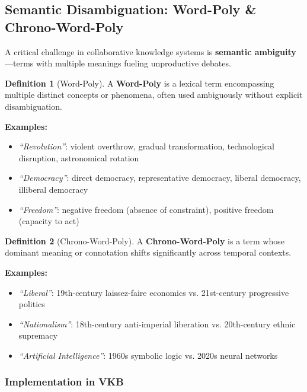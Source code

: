 \documentclass[11pt,a4paper]{article}
\theoremstyle{definition}
\newtheorem{definition}{Definition}[section]
\theoremstyle{remark}
\begin{document}
\subsection{Semantic Disambiguation: Word-Poly \& Chrono-Word-Poly}

A critical challenge in collaborative knowledge systems is \textbf{semantic ambiguity}—terms with multiple meanings fueling unproductive debates.

\begin{definition}[Word-Poly]
A \textbf{Word-Poly} is a lexical term encompassing multiple distinct concepts or phenomena, often used ambiguously without explicit disambiguation.

\textbf{Examples:}
\begin{itemize}
    \item \textit{``Revolution''}: violent overthrow, gradual transformation, technological disruption, astronomical rotation
    \item \textit{``Democracy''}: direct democracy, representative democracy, liberal democracy, illiberal democracy
    \item \textit{``Freedom''}: negative freedom (absence of constraint), positive freedom (capacity to act)
\end{itemize}
\end{definition}

\begin{definition}[Chrono-Word-Poly]
A \textbf{Chrono-Word-Poly} is a term whose dominant meaning or connotation shifts significantly across temporal contexts.

\textbf{Examples:}
\begin{itemize}
    \item \textit{``Liberal''}: 19th-century laissez-faire economics vs. 21st-century progressive politics
    \item \textit{``Nationalism''}: 18th-century anti-imperial liberation vs. 20th-century ethnic supremacy
    \item \textit{``Artificial Intelligence''}: 1960s symbolic logic vs. 2020s neural networks
\end{itemize}
\end{definition}

\subsubsection{Implementation in VKB}
\end{document}
